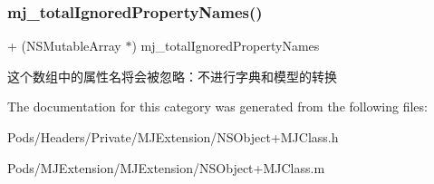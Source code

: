 \subsubsection{\texorpdfstring{mj\+\_\+total\+Ignored\+Property\+Names()}{mj\_totalIgnoredPropertyNames()}\hspace{0.1cm}{\footnotesize\ttfamily [3/3]}}
{\footnotesize\ttfamily + (N\+S\+Mutable\+Array $\ast$) mj\+\_\+total\+Ignored\+Property\+Names \begin{DoxyParamCaption}{ }\end{DoxyParamCaption}}

这个数组中的属性名将会被忽略：不进行字典和模型的转换 

The documentation for this category was generated from the following files\+:\begin{DoxyCompactItemize}
\item 
Pods/\+Headers/\+Private/\+M\+J\+Extension/N\+S\+Object+\+M\+J\+Class.\+h\item 
Pods/\+M\+J\+Extension/\+M\+J\+Extension/N\+S\+Object+\+M\+J\+Class.\+m\end{DoxyCompactItemize}
